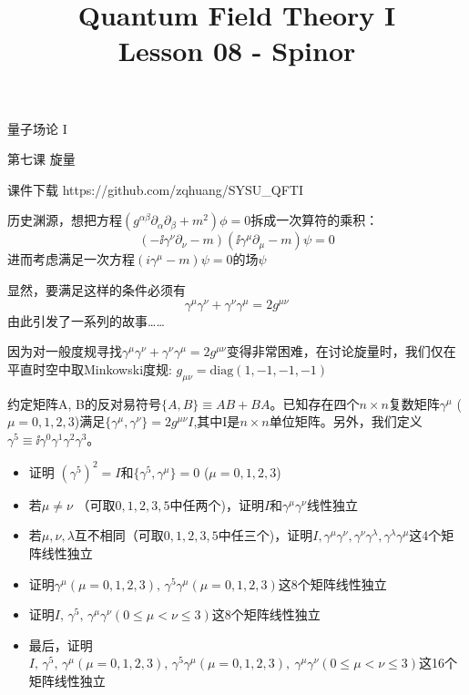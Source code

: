 \documentclass[CJK]{beamer}
\title{Quantum Field Theory I \\ Lesson 08 - Spinor}
\author{}
\date{}
\begin{document}
\begin{frame}
 
\begin{center}
\begin{Large}
\bch
量子场论 I 

{\vskip 0.3in}

第七课 旋量

\ech
\end{Large}
\end{center}

\vskip 0.2in

\bch
课件下载
\ech
https://github.com/zqhuang/SYSU\_QFTI

\end{frame}


\begin{frame}
\bch
历史渊源，想把方程$(g^{\alpha\beta}\partial_\alpha\partial_\beta + m^2)\phi = 0$拆成一次算符的乘积：
$$(-\ii\gamma^\nu\partial_\nu - m)(\ii \gamma^\mu\partial_\mu - m)\psi = 0$$
进而考虑满足一次方程$(i\gamma^\mu - m)\psi = 0$的场$\psi$

\skipline
显然，要满足这样的条件必须有
$$\gamma^\mu\gamma^\nu + \gamma^\nu\gamma^\mu = 2g^{\mu\nu}$$
由此引发了一系列的故事……
\ech
\end{frame}


\begin{frame}
\bch
因为对一般度规寻找$\gamma^\mu\gamma^\nu + \gamma^\nu\gamma^\mu = 2g^{\mu\nu}$变得非常困难，在讨论旋量时，我们仅在平直时空中取Minkowski度规:
$g_{\mu\nu} = \mathrm{diag}(1, -1, -1, -1)$
\ech

\end{frame}

\begin{frame}
\bch

约定矩阵A, B的反对易符号$\{A, B\}\equiv AB + BA$。已知存在四个$n\times n$复数矩阵$\gamma^\mu$ ($\mu = 0, 1, 2, 3$)满足$\{\gamma^\mu,\gamma^\nu\} = 2g^{\mu\nu}I$,其中I是$n\times n $单位矩阵。另外，我们定义$\gamma^5\equiv \ii\gamma^0\gamma^1\gamma^2\gamma^3$。
\begin{itemize}
\item{证明 $(\gamma^5)^2 = I$和$\{\gamma^5,\gamma^\mu\} = 0$ ($\mu = 0,1,2,3$)}
\item{若$\mu\ne \nu$ （可取$0,1,2,3,5$中任两个)，证明$I$和$\gamma^\mu\gamma^\nu$线性独立}
\item{若$\mu,\nu,\lambda$互不相同（可取$0,1,2,3,5$中任三个)，证明$I,\gamma^\mu\gamma^\nu,\gamma^\nu\gamma^\lambda,\gamma^\lambda\gamma^\mu$这4个矩阵线性独立}
\item{证明$\gamma^\mu (\mu = 0,1,2,3),\, \gamma^5\gamma^\mu (\mu = 0,1,2,3)$这8个矩阵线性独立}
\item{证明$I,\, \gamma^5,\,  \gamma^\mu\gamma^\nu (0\le \mu<\nu\le 3)$这8个矩阵线性独立}
\item{最后，证明 $I,\, \gamma^5,\, \gamma^\mu(\mu=0,1,2,3),\, \gamma^5\gamma^\mu(\mu=0,1,2,3),\ \gamma^\mu\gamma^\nu (0\le \mu<\nu\le 3)$这16个矩阵线性独立}
\end{itemize}

\ech
\end{frame}
\end{document}
